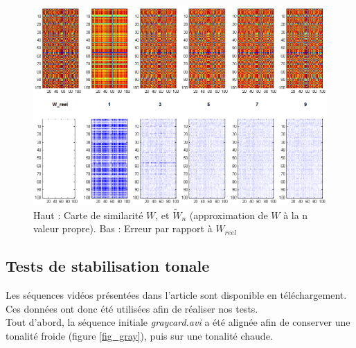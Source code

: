 \begin{figure}[H]
\centering
\includegraphics[width =\textwidth]{Chapters/Images/eigenvalues}
\caption{Haut : Carte de similarité $W$, et $\tilde{W}_{n}$ (approximation de $W$ à la n valeur propre). Bas : Erreur par rapport à $W_{reel}$}
\label{fig_nystrom_results}
\end{figure}


\subsection{Tests de stabilisation tonale}
Les séquences vidéos présentées dans l'article \cite{farbman2011tonal} sont disponible en téléchargement. Ces données ont donc été utilisées afin de réaliser nos tests.\\

Tout d'abord, la séquence initiale \textit{graycard.avi} a été alignée afin de conserver une tonalité froide (figure \ref{fig_gray}), puis sur une tonalité chaude.

